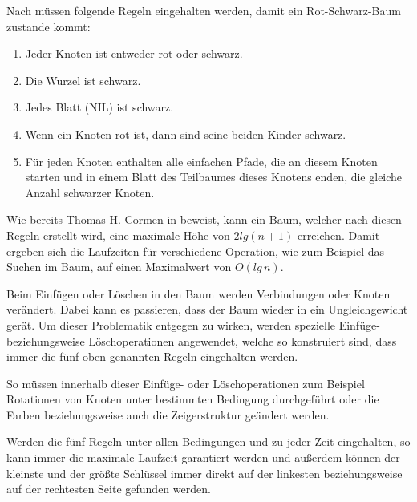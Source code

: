  
Nach \cite{tcormen} müssen folgende Regeln eingehalten werden, damit ein Rot-Schwarz-Baum zustande kommt:

\begin{enumerate}
	\item Jeder Knoten ist entweder rot oder schwarz.
	\item Die Wurzel ist schwarz.
	\item Jedes Blatt (NIL) ist schwarz.
	\item Wenn ein Knoten rot ist, dann sind seine beiden Kinder schwarz.
	\item Für jeden Knoten enthalten alle einfachen Pfade, die an diesem Knoten starten und in einem Blatt des Teilbaumes dieses Knotens enden, die gleiche Anzahl schwarzer Knoten. 
\end{enumerate}

Wie bereits Thomas H. Cormen in \cite{tcormen} beweist, kann ein Baum, welcher nach diesen Regeln erstellt wird, eine maximale Höhe von $2lg(n+1)$ erreichen. Damit ergeben sich die Laufzeiten für verschiedene Operation, wie zum Beispiel das Suchen im Baum, auf einen Maximalwert von $O(lg\, n)$.

Beim Einfügen oder Löschen in den Baum werden Verbindungen oder Knoten verändert. Dabei kann es passieren, dass der Baum wieder in ein Ungleichgewicht gerät. 
Um dieser Problematik entgegen zu wirken, werden spezielle Einfüge- beziehungsweise Lösch\-operationen angewendet, welche so konstruiert sind, dass immer die fünf oben genannten Regeln eingehalten werden. 

So müssen innerhalb dieser Einfüge- oder Lösch\-ope\-ra\-ti\-on\-en zum Beispiel Rotationen von Knoten unter bestimmten Bedingung durchgeführt oder die Farben beziehungsweise auch die Zeigerstruktur geändert werden.

Werden die fünf Regeln unter allen Bedingungen und zu jeder Zeit eingehalten, so kann immer die maximale Laufzeit garantiert werden und außerdem können der kleinste und der größte Schlüssel immer direkt auf der linkesten beziehungsweise auf der rechtesten Seite gefunden werden.

